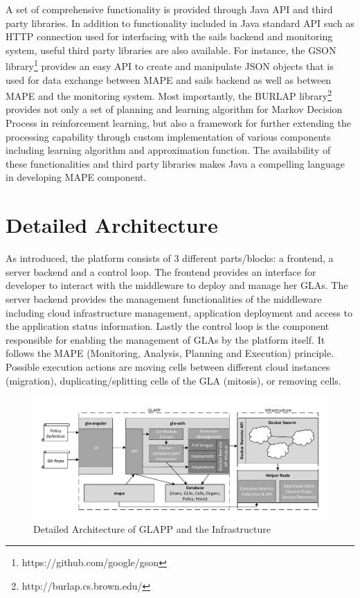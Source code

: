 \documentclass{seal_thesis}
\begin{document}
A set of comprehensive functionality is provided through Java API and third party libraries.
In addition to functionality included in Java standard API such as HTTP connection used for interfacing with the sails backend and monitoring system, useful third party libraries are also available.
For instance, the GSON library\footnote{https://github.com/google/gson} provides an easy API to create and manipulate JSON objects that is used for data exchange between MAPE and sails backend as well as between MAPE and the monitoring system.
Most importantly, the BURLAP library\footnote{http://burlap.cs.brown.edu/} provides not only a set of planning and learning algorithm for Markov Decision Process in reinforcement learning, but also a framework for further extending the processing capability through custom implementation of various components including learning algorithm and approximation function.
The availability of these functionalities and third party libraries makes Java a compelling language in developing MAPE component.


\section{Detailed Architecture}\label{sec:detailedArchitecture}
As introduced, the platform consists of 3 different parts/blocks: a frontend, a server backend and a control loop.
The frontend provides an interface for developer to interact with the middleware to deploy and manage her GLAs.
The server backend provides the management functionalities of the middleware including cloud infrastructure management, application deployment and access to the application status information.
Lastly the control loop is the component responsible for enabling the management of GLAs by the platform itself.
It follows the MAPE (Monitoring, Analysis, Planning and Execution) principle.
Possible execution actions are moving cells between different cloud instances (migration), duplicating/splitting cells of the GLA (mitosis), or removing cells.

\begin{figure}[!ht]
\centering
	\includegraphics[width=\textwidth]{detailed_architecture.pdf}
	\caption{Detailed Architecture of GLAPP and the Infrastructure}
	\label{fig:detailed}
\end{figure}
\end{document}
